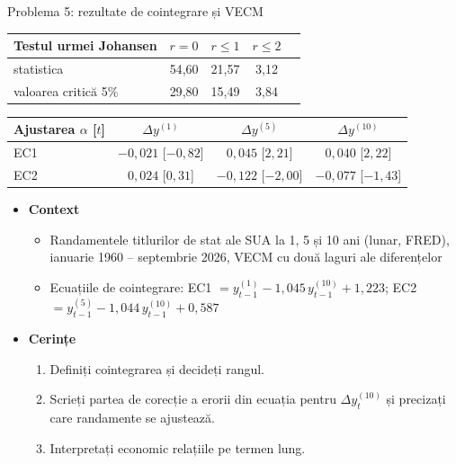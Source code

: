 \begin{frame}{Problema 5: rezultate de cointegrare și VECM}
\itemsize{\footnotesize}
\begin{center}
\scriptsize
\begin{tabular}{lcccc}
\toprule
\textbf{Testul urmei Johansen} & $r = 0$ & $r \le 1$ & $r \le 2$ & \\
\midrule
statistica & 54{,}60 & 21{,}57 & 3{,}12 & \\
valoarea critică 5\% & 29{,}80 & 15{,}49 & 3{,}84 & \\
\bottomrule
\end{tabular}
\end{center}
\begin{center}
\scriptsize
\begin{tabular}{lccc}
\toprule
\textbf{Ajustarea} $\alpha$ [$t$] & $\Delta y^{(1)}$ & $\Delta y^{(5)}$ & $\Delta y^{(10)}$ \\
\midrule
EC1 & $\ensuremath{-}0{,}021$ [$\ensuremath{-}0{,}82$] & $0{,}045$ [$2{,}21$] & $0{,}040$ [$2{,}22$] \\
EC2 & $0{,}024$ [$0{,}31$] & $\ensuremath{-}0{,}122$ [$\ensuremath{-}2{,}00$] & $\ensuremath{-}0{,}077$ [$\ensuremath{-}1{,}43$] \\
\bottomrule
\end{tabular}
\end{center}
\begin{itemize}
    \item \textbf{Context}
    \begin{itemize}
        \item Randamentele titlurilor de stat ale SUA la 1, 5 și 10 ani (lunar, FRED), ianuarie 1960 -- septembrie 2026, VECM cu două laguri ale diferențelor
        \item Ecuațiile de cointegrare: EC1 $= y^{(1)}_{t-1} - 1{,}045\,y^{(10)}_{t-1} + 1{,}223$; EC2 $= y^{(5)}_{t-1} - 1{,}044\,y^{(10)}_{t-1} + 0{,}587$
    \end{itemize}
    \item \textbf{Cerințe}
\begin{enumerate}
    \item Definiți cointegrarea și decideți rangul.
    \item Scrieți partea de corecție a erorii din ecuația pentru $\Delta y^{(10)}_t$ și precizați care randamente se ajustează.
    \item Interpretați economic relațiile pe termen lung.
\end{enumerate}
\end{itemize}
\end{frame}

